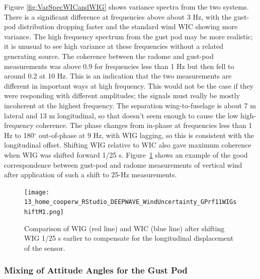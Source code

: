 \documentclass[12pt,twoside,english]{article}\usepackage[]{graphicx}\usepackage[]{color}
\begin{document}
Figure \ref{fig:VarSpecWICandWIG} shows variance spectra from the two systems. There is a significant difference at frequencies above about 3 Hz, with the gust-pod distribution dropping faster and the standard wind WIC showing more variance. The high frequency spectrum from the gust pod may be more realistic; it is unusual to see high variance at these frequencies without a related generating source. The coherence between the radome and gust-pod measurements was above 0.9 for frequencies less than 1 Hz but then fell to around 0.2 at 10 Hz. This is an indication that the two measurements are different in important ways at high frequency. This would not be the case if they were responding with different amplitudes; the signals must really be mostly incoherent at the highest frequency. The separation wing-to-fuselage is about 7 m lateral and 13 m longitudinal, so that doesn't seem enough to cause the low high-frequency coherence. The phase changes from in-phase at frequencies less than 1 Hz to 180$^{\circ}$ out-of-phase at 9 Hz, with WIG lagging, so this is consistent with the longitudinal offset. Shifting WIG relative to WIC also gave maximum coherence when WIG was shifted forward 1/25 s. Figure~\ref{fig:FurtherExpandedWIGshifted} shows an example of the good correspondence between gust-pod and radome measurements of vertical wind after application of such a shift to 25-Hz measurements. 

\begin{figure}
\noindent \begin{centering}
\texttt{[image: 13\_home\_cooperw\_RStudio\_DEEPWAVE\_WindUncertainty\_GPrf11WIGshiftM1.png]}  
\par\end{centering}

\protect\caption{\label{fig:FurtherExpandedWIGshifted}Comparison of WIG (red line) and WIC (blue line) after shifting WIG 1/25 s earlier to compensate for the longitudinal displacement of the sensor.} 
\end{figure}


\subsubsection{Mixing of Attitude Angles for the Gust Pod}

\end{document}
